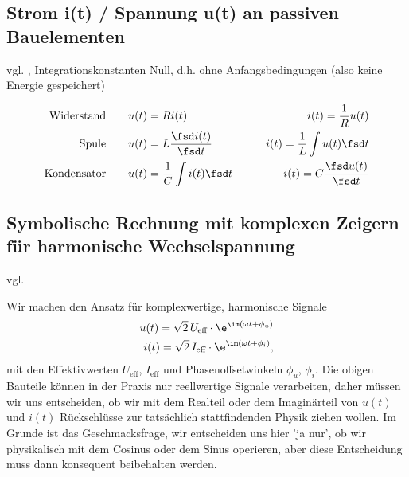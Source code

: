\subsection{Strom i(t) / Spannung u(t) an passiven Bauelementen}

vgl. \cite[Kap. 10.2.2]{Marinescu2020}, Integrationskonstanten Null, d.h. ohne Anfangsbedingungen (also keine Energie gespeichert)

\begin{align}
\text{Widerstand} \qquad & u(t) = R i(t) \qquad& i(t) = \frac{1}{R} u(t)\\
\text{Spule} \qquad & u(t) = L \frac{\fsd i(t)}{\fsd t} \qquad& i(t) = \frac{1}{L} \int u(t) \fsd t\\
\text{Kondensator} \qquad & u(t) = \frac{1}{C} \int i(t) \fsd t \qquad& i(t) = C \frac{\fsd u(t)}{\fsd t}
\end{align}

\subsection{Symbolische Rechnung mit komplexen Zeigern für harmonische Wechselspannung}

vgl. \cite[Kap. 10.3]{Marinescu2020}

Wir machen den Ansatz für komplexwertige, harmonische Signale
\begin{align}
u(t) = \sqrt{2} \, U_\text{eff} \cdot \e^{\im(\omega t + \phi_u)}\\
i(t) = \sqrt{2} \, I_\text{eff} \cdot \e^{\im(\omega t + \phi_i)},
\end{align}
mit den Effektivwerten $U_\text{eff}$, $I_\text{eff}$ und Phasenoffsetwinkeln
$\phi_u$, $\phi_i$.
%
Die obigen Bauteile können in der Praxis nur reellwertige Signale
verarbeiten, daher müssen wir uns entscheiden, ob wir mit dem Realteil oder dem
Imaginärteil von $u(t)$ und $i(t)$ Rückschlüsse zur tatsächlich stattfindenden
Physik ziehen wollen.
Im Grunde ist das Geschmacksfrage, wir entscheiden uns hier 'ja nur', ob wir
physikalisch mit dem Cosinus oder dem Sinus operieren, aber diese Entscheidung
muss dann konsequent beibehalten werden.

